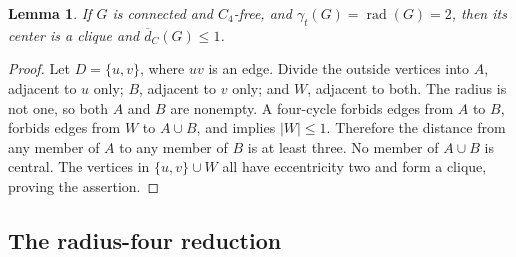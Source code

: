 \documentclass[11pt,a4paper]{article}
\newtheorem{lemma}[theorem]{Lemma}
\theoremstyle{definition}\newtheorem{definition}[theorem]{Definition}
\theoremstyle{remark}\newtheorem{remark}[theorem]{Remark}
\newcommand{\rad}{\operatorname{rad}}
\begin{document}
\begin{lemma}
\label{early:lem:radius-two}
If $G$ is connected and $C_4$-free, and
$\gamma_t(G)=\rad(G)=2$, then its center is a clique and
$\overline d_C(G)\leq1$.
\end{lemma}
\begin{proof}
Let $D=\{u,v\}$, where $uv$ is an edge.  Divide the outside vertices
into $A$, adjacent to $u$ only; $B$, adjacent to $v$ only; and $W$,
adjacent to both.  The radius is not one, so both $A$ and $B$ are
nonempty.  A four-cycle forbids edges from $A$ to $B$, forbids edges
from $W$ to $A\cup B$, and implies $|W|\leq1$.  Therefore the
distance from any member of $A$ to any member of $B$ is at least
three.  No member of $A\cup B$ is central.  The vertices in
$\{u,v\}\cup W$ all have eccentricity two and form a clique, proving
the assertion.
\end{proof}

\subsection{The radius-four reduction}
\end{document}
